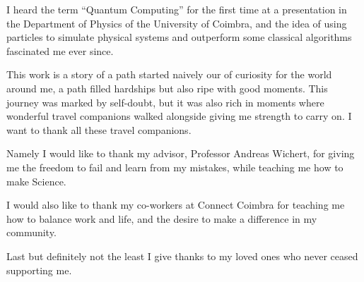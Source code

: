 
\begin{acknowledgments} 

 I heard the term ``Quantum Computing'' for the first time at a presentation in the Department of Physics of the University of Coimbra, and the idea of using particles to simulate physical systems and outperform some classical algorithms fascinated me ever since. 

This work is a story of a path started naively our of curiosity for the world around me, a path filled hardships but also ripe with good moments.
This journey was marked by self-doubt, but it was also rich in moments where wonderful travel companions walked alongside giving me strength to carry on. I want to thank all these travel companions.

Namely I would like to thank my advisor, Professor Andreas Wichert, for giving me the freedom to fail and learn from my mistakes, while teaching me how to make Science. 

I would also like to thank my co-workers at Connect Coimbra for teaching me how to balance work and life, and the desire to make a difference in my community.

Last but definitely not the least I give thanks to my loved ones who never ceased supporting me. 
 
\end{acknowledgments}
\clearpage
\thispagestyle{empty}
\cleardoublepage